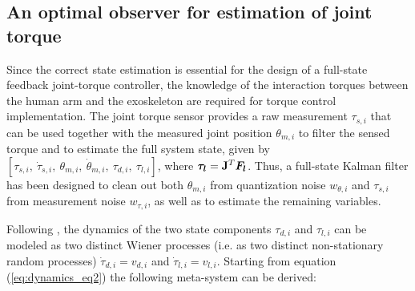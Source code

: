 \subsection{An optimal observer for estimation of joint torque}\label{subsec:kalmanTorque}
Since the correct state estimation  is essential for the design of a full-state feedback joint-torque controller, the knowledge of the interaction torques between the human arm and the exoskeleton are required for  torque control implementation. The joint torque sensor provides a raw measurement $\tau_{s,i}$ that can be used together with the measured joint position $\theta_{m,i}$ to filter the sensed torque and to estimate the full system state, given by $[\tau_{s,i},\ \dot{\tau}_{s,i},\ \theta_{m,i},\ \dot{\theta}_{m,i},\ \tau_{d,i},\ \tau_{l,i}]$, where ${ \boldsymbol {\tau_l}}=\mathbf{J}^T { \boldsymbol {F_l}}$. 
Thus, a full-state Kalman filter has been designed to clean out both  $\theta_{m,i}$ from quantization noise $w_{\theta,i}$ and $\tau_{s,i}$ from measurement noise $w_{\tau,i}$, as well as to estimate the remaining variables.
%
\par 
Following \cite{vertechy2012interaction}, the dynamics of the two state components $\tau_{d,i}$ and $\tau_{l,i}$ can be modeled as two distinct Wiener processes (i.e. as two distinct non-stationary random processes) $\dot{\tau}_{d,i}=v_{d,i}$ and $\dot{\tau}_{l,i}=v_{l,i}$. Starting from equation (\ref{eq:dynamics_eq2}) the following meta-system can be derived:



